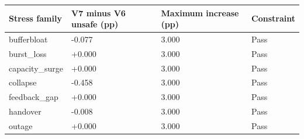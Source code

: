 \begin{tabular}{llll}
\toprule
Stress family & V7 minus V6 unsafe (pp) & Maximum increase (pp) & Constraint \\
\midrule
bufferbloat & -0.077 & 3.000 & Pass \\
burst\_loss & +0.000 & 3.000 & Pass \\
capacity\_surge & +0.000 & 3.000 & Pass \\
collapse & -0.458 & 3.000 & Pass \\
feedback\_gap & +0.000 & 3.000 & Pass \\
handover & -0.008 & 3.000 & Pass \\
outage & +0.000 & 3.000 & Pass \\
\bottomrule
\end{tabular}
